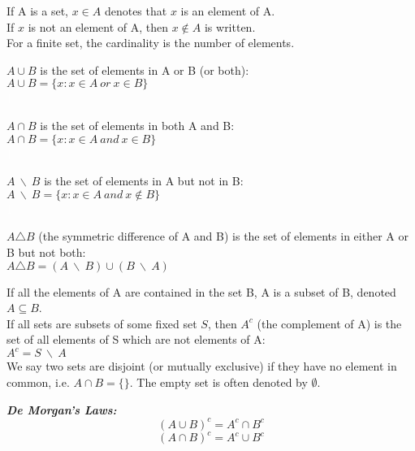 \documentclass{report}
\newenvironment{cframedp}[1][Black]
  {\begin{tcolorbox}[colframe=#1,colback=white]}
  {\end{tcolorbox}}
\begin{document}
If A is a set, $x \in A$ denotes that $x$ is an element of A.\\
If $x$ is not an element of A, then $x \notin A$ is written.\\
For a finite set, the cardinality is the number of elements.\\

\begin{cframedp}
\begin{center}
$A \cup B$ is the set of elements in A or B (or both):\\
$A \cup B = \{x:x \in A\: or\: x \in B \}$\\

\textcolor{White}{1}

$A \cap B$ is the set of elements in both A and B:\\
$A \cap B = \{x:x \in A\: and\: x \in B\}$\\

\textcolor{White}{1}

$A\: \backslash \: B$ is the set of elements in A but not in B:\\
$A\: \backslash \: B = \{x:x \in A \: and \: x \notin B \} $\\

\textcolor{White}{1}

$A \triangle B$ (the symmetric difference of A and B) is the set of elements in either A or B but not both:\\
$A \triangle B = (A\: \backslash \: B) \cup (B\: \backslash \: A)$\\
\end{center}
\end{cframedp}

If all the elements of A are contained in the set B, A is a subset of B, denoted $A \subseteq B$.\\

If all sets are subsets of some fixed set $S$, then $A^c$ (the complement of A) is the set of all elements of S which are not elements of A:\\
$A^c = S\: \backslash \: A$\\

We say two sets are disjoint (or mutually exclusive) if they have no element in common, i.e. $A \cap B = \{ \}$. The empty set is often denoted by $\emptyset.$\\

\begin{cframedp}

\centering\textbf{\textit{De Morgan's Laws:}}
\begin{equation}
    (A \cup B)^c = A^c \cap B^c
\end{equation}
\begin{equation}
    (A \cap B)^c = A^c \cup B^c 
\end{equation}
\end{cframedp}
\end{document}
